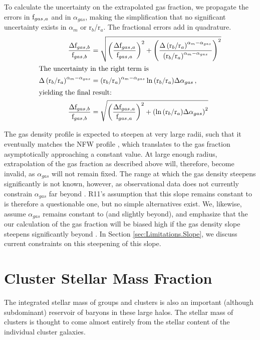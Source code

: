 To calculate the uncertainty on the extrapolated gas fraction, we
propagate the errors in $\textrm{f\ensuremath{_{gas}}}{}_{,a}$ and in $\alpha_{gas}$, making the
simplification that no significant uncertainty exists in $\alpha_m$ or
r$_b$/r$_a$. The fractional errors add in quadrature.
\begin{align}
\frac{\Delta\textrm{f\ensuremath{_{gas}}}{}_{,b}}{\textrm{f\ensuremath{_{gas}}}{}_{,b}} &=
\sqrt{\left(\frac{\Delta\textrm{f\ensuremath{_{gas}}}{}_{,a}}{\textrm{f\ensuremath{_{gas}}}{}_{,a}}\right)^2 +
  \left(\frac{\Delta\left(\textrm{r}_b/\textrm{r}_a\right)^{\alpha_m-\alpha_{gas}}}{\left(\textrm{r}_b/\textrm{r}_a\right)^{\alpha_m-\alpha_{gas}}}\right)^2}\nonumber\\
\intertext{The uncertainty in the right term is}
\Delta\left(\textrm{r}_b/\textrm{r}_a\right)^{\alpha_m-\alpha_{gas}}
& =
\left(\textrm{r}_b/\textrm{r}_a\right)^{\alpha_m-\alpha_{gas}}\ln{\left(\textrm{r}_b/\textrm{r}_a\right)}\Delta\alpha_{gas}\,,\nonumber\\
\intertext{yielding the final result:}
\frac{\Delta\textrm{f\ensuremath{_{gas}}}{}_{,b}}{\textrm{f\ensuremath{_{gas}}}{}_{,b}} &=
\sqrt{\left(\frac{\Delta\textrm{f\ensuremath{_{gas}}}{}_{,a}}{\textrm{f\ensuremath{_{gas}}}{}_{,a}}\right)^2 +
  \left(\ln{\left(\textrm{r}_b/\textrm{r}_a\right)}\Delta\alpha_{gas}\right)^2}
\end{align}

The gas density profile is expected to steepen at very large radii,
such that it eventually matches the NFW profile ,
which translates to the gas fraction asymptotically approaching a
constant value. At large enough radius, extrapolation of the gas
fraction as described above will, therefore, become invalid, as
$\alpha_{gas}$ will not remain fixed. The range at which the gas
density steepens significantly is not known, however, as observational
data does not currently constrain $\alpha_{gas}$ far beyond
\rfive. R11's assumption that this slope remains constant to \rvir{}
is therefore a questionable one, but no simple alternatives exist. We,
likewise, assume $\alpha_{gas}$ remains constant to \rvir{} (and
slightly beyond), and emphasize that the our calculation of the gas
fraction will be biased high if the gas density slope steepens
significantly beyond \rfive{}. In Section
\ref{sec:Limitations.Slope}, we discuss current constraints on this
steepening of this slope.

\section{Cluster Stellar Mass Fraction}
\label{sec:Stellar}

The integrated stellar mass of groups and clusters is also an
important (although subdominant) reservoir of baryons in these large
halos. The stellar mass of clusters is thought to come almost entirely
from the stellar content of the individual cluster galaxies.

